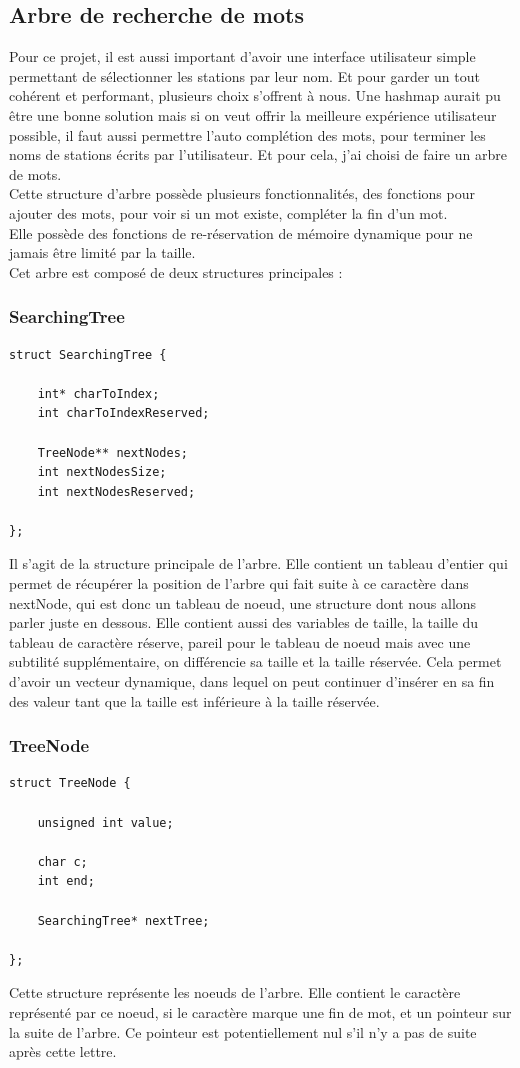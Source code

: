\documentclass[11pt]{article}
\begin{document}
\subsection{Arbre de recherche de mots}
Pour ce projet, il est aussi important d'avoir une interface utilisateur simple permettant de sélectionner les stations par leur nom. Et pour garder un tout cohérent et performant, plusieurs choix s'offrent à nous. Une hashmap aurait pu être une bonne solution mais si on veut offrir la meilleure expérience utilisateur possible, il faut aussi permettre l'auto complétion des mots, pour terminer les noms de stations écrits par l'utilisateur. Et pour cela, j'ai choisi de faire un arbre de mots.\\
Cette structure d'arbre possède plusieurs fonctionnalités, des fonctions pour ajouter des mots, pour voir si un mot existe, compléter la fin d'un mot.\\
Elle possède des fonctions de re-réservation de mémoire dynamique pour ne jamais être limité par la taille.\\
Cet arbre est composé de deux structures principales :
\subsubsection{SearchingTree}
\begin{lstlisting}
struct SearchingTree {

	int* charToIndex;
	int charToIndexReserved;

	TreeNode** nextNodes;
	int nextNodesSize;
	int nextNodesReserved;

};
\end{lstlisting}
Il s'agit de la structure principale de l'arbre. Elle contient un tableau d'entier qui permet de récupérer la position de l'arbre qui fait suite à ce caractère dans nextNode, qui est donc un tableau de noeud, une structure dont nous allons parler juste en dessous. Elle contient aussi des variables de taille, la taille du tableau de caractère réserve, pareil pour le tableau de noeud mais avec une subtilité supplémentaire, on différencie sa taille et la taille réservée. Cela permet d'avoir un vecteur dynamique, dans lequel on peut continuer d'insérer en sa fin des valeur tant que la taille est inférieure à la taille réservée.\\
\subsubsection{TreeNode}
\begin{lstlisting}
struct TreeNode {

	unsigned int value;

	char c;
	int end;

	SearchingTree* nextTree;

};
\end{lstlisting}
Cette structure représente les noeuds de l'arbre. Elle contient le caractère représenté par ce noeud, si le caractère marque une fin de mot, et un pointeur sur la suite de l'arbre. Ce pointeur est potentiellement nul s'il n'y a pas de suite après cette lettre.\\
\end{document}
